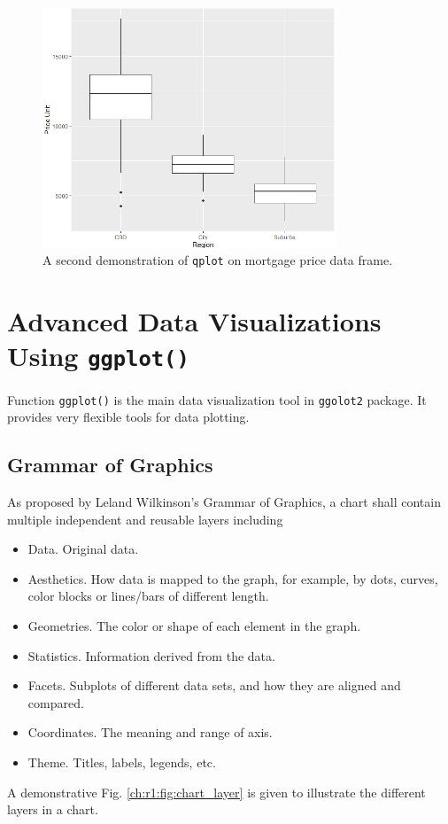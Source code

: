 \begin{figure}
	\centering
	\includegraphics[width=250pt]{chapters/ch-r/figures/mortgage_demo2.png}
	\caption{A second demonstration of \texttt{qplot} on mortgage price data frame.} \label{ch:r1:fig:mortgage_demo2}
\end{figure}

\section{Advanced Data Visualizations Using \texttt{ggplot()}} \label{ch:r1:sec:ggplot}

Function \verb|ggplot()| is the main data visualization tool in \verb|ggolot2| package. It provides very flexible tools for data plotting.

\subsection{Grammar of Graphics}

As proposed by Leland Wilkinson's Grammar of Graphics, a chart shall contain multiple independent and reusable layers including
\begin{itemize}
  \item Data. Original data.
  \item Aesthetics. How data is mapped to the graph, for example, by dots, curves, color blocks or lines/bars of different length.
  \item Geometries. The color or shape of each element in the graph.
  \item Statistics. Information derived from the data.
  \item Facets. Subplots of different data sets, and how they are aligned and compared.
  \item Coordinates. The meaning and range of axis.
  \item Theme. Titles, labels, legends, etc.
\end{itemize}
A demonstrative Fig. \ref{ch:r1:fig:chart_layer} is given to illustrate the different layers in a chart.

